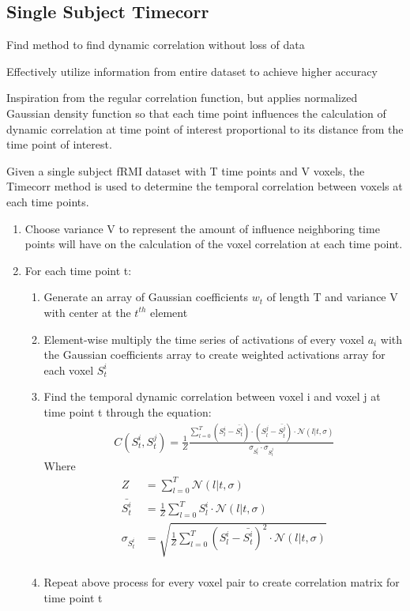 \documentclass[12pt]{article}
\begin{document}
\subsection{Single Subject Timecorr}
Find method to find dynamic correlation without loss of data

Effectively utilize information from entire dataset to achieve higher accuracy

Inspiration from the regular correlation function, but applies normalized Gaussian density function so that each time point influences the calculation of dynamic correlation at time point of interest proportional to its distance from the time point of interest.

Given a single subject fRMI dataset with T time points and V voxels, the Timecorr method is used to determine the temporal correlation between voxels at each time points. \\
\begin{enumerate}
\item Choose variance V to represent the amount of influence neighboring time points will have on the calculation of the voxel correlation at each time point.\\
\item For each time point t:
\begin{enumerate}
\item Generate an array of Gaussian coefficients $w_t$ of length T and variance V with center at the $t^{th}$ element\\
\item Element-wise multiply the time series of activations of every voxel $a_i$ with the Gaussian coefficients array to create weighted activations array for each voxel $S^i_t$\\
\item Find the temporal dynamic correlation between voxel i and voxel j at time point t through the equation:
\begin{align*}
C(S^i_t,S^j_t) = \frac{1}{Z}\frac{\sum_{l=0}^T (S_l^i - \bar{S^i_t})\cdot(S^j_l - \bar{S^j_t})\cdot \mathcal{N}(l|t,\sigma)}{\sigma_{S_t^i} \cdot \sigma_{S_t^j}}
\end{align*}
Where
\begin{align*}
Z &= \sum_{l=0}^T \mathcal{N}(l|t,\sigma)\\
\bar{S^i_t} &=\frac{1}{Z} \sum_{l=0}^T S^i_l \cdot \mathcal{N}(l|t,\sigma)\\
\sigma_{S_t^i} &=\sqrt{ \frac{1}{Z}\sum_{l=0}^T (S_l^i-\bar{S_t^i})^2 \cdot \mathcal{N}(l|t,\sigma)}\\
\end{align*}
\item Repeat above process for every voxel pair to create correlation matrix for time point t
\end{enumerate}
\end{enumerate}
\end{document}
